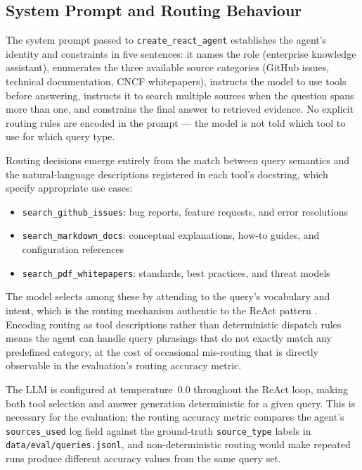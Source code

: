 \subsection{System Prompt and Routing Behaviour}

The system prompt passed to \texttt{create\_react\_agent} establishes the agent's identity and constraints in five sentences: it names the role (enterprise knowledge assistant), enumerates the three available source categories (GitHub issues, technical documentation, CNCF whitepapers), instructs the model to use tools before answering, instructs it to search multiple sources when the question spans more than one, and constrains the final answer to retrieved evidence. No explicit routing rules are encoded in the prompt — the model is not told which tool to use for which query type.

Routing decisions emerge entirely from the match between query semantics and the natural-language descriptions registered in each tool's docstring, which specify appropriate use cases:

\begin{itemize}
\item \texttt{search\_github\_issues}: bug reports, feature requests, and error resolutions
\item \texttt{search\_markdown\_docs}: conceptual explanations, how-to guides, and configuration references
\item \texttt{search\_pdf\_whitepapers}: standards, best practices, and threat models
\end{itemize}

The model selects among these by attending to the query's vocabulary and intent, which is the routing mechanism authentic to the ReAct pattern \cite{yao2023react}. Encoding routing as tool descriptions rather than deterministic dispatch rules means the agent can handle query phrasings that do not exactly match any predefined category, at the cost of occasional mis-routing that is directly observable in the evaluation's routing accuracy metric.

The LLM is configured at temperature~0.0 throughout the ReAct loop, making both tool selection and answer generation deterministic for a given query. This is necessary for the evaluation: the routing accuracy metric compares the agent's \texttt{sources\_used} log field against the ground-truth \texttt{source\_type} labels in \texttt{data/eval/queries.jsonl}, and non-deterministic routing would make repeated runs produce different accuracy values from the same query set.

